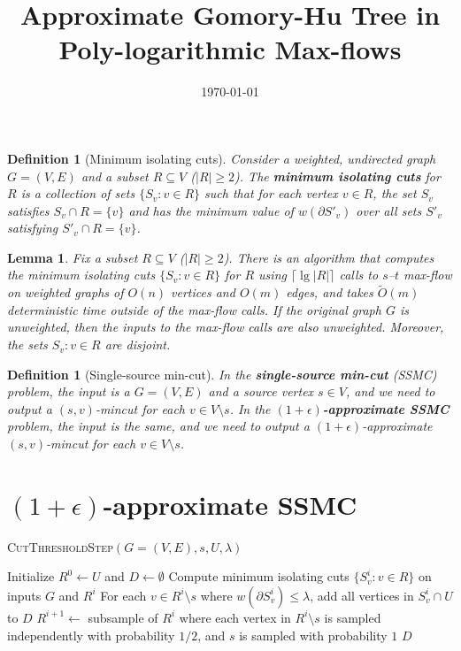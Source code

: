 \documentclass{article}
\newcommand{\sm}{\setminus}
\newcommand{\s}{\subseteq}
\newcommand{\e}{\epsilon}
\newcommand{\la}{\lambda}
\newcommand{\pt}{\partial}
\newcommand{\lf}{\lfloor}
\newcommand{\rf}{\rfloor}
\newcommand{\lc}{\lceil}
\newcommand{\rc}{\rceil}
\newcommand{\1}{\mathbbm 1}
\newtheorem{lemma}[theorem]{Lemma}
\newtheorem{definition}[theorem]{Definition}
\newcommand{\BL}{\begin{lemma}}
\newcommand{\EL}{\end{lemma}}
\newcommand{\BD}{\begin{definition}}
\newcommand{\ED}{\end{definition}}
\newcommand{\tO}{\tilde{O}}
\newcommand{\linel}[1]{\label{line:#1}}
\renewcommand{\emph}[1]{\textbf{\textup{#1}}}
\begin{document}
\title{Approximate Gomory-Hu Tree in Poly-logarithmic Max-flows}
\author{}
\date{\today}
\maketitle

\BD[Minimum isolating cuts]
Consider a weighted, undirected graph $G=(V,E)$ and a subset $R\s V$ ($|R|\ge2$). The \emph{minimum isolating cuts} for $R$ is a collection of sets $\{S_v:v\in R\}$ such that for each vertex $v\in R$, the set $S_v$ satisfies $S_v\cap R=\{v\}$ and has the minimum value of $w(\pt S'_v)$ over all sets $S'_v$ satisfying $S'_v\cap R=\{v\}$.
\ED

\BL
Fix a subset $R\s V$ ($|R|\ge2$). There is an algorithm that computes the minimum isolating cuts $\{S_v:v\in R\}$ for $R$ using $\lc\lg|R|\rc$ calls to $s$--$t$ max-flow on weighted graphs of $O(n)$ vertices and $O(m)$ edges, and takes $\tO(m)$ deterministic time outside of the max-flow calls. If the original graph $G$ is unweighted, then the inputs to the max-flow calls are also unweighted. Moreover, the sets $S_v:v\in R$ are disjoint.
\EL

\BD[Single-source min-cut]
In the \emph{single-source min-cut} (SSMC) problem, the input is a $G=(V,E)$ and a source vertex $s\in V$, and we need to output a $(s,v)$-mincut for each $v\in V\sm s$. In the \emph{$(1+\e)$-approximate SSMC} problem, the input is the same, and we need to output a $(1+\e)$-approximate $(s,v)$-mincut for each $v\in V\sm s$.
\ED

\section{$(1+\e)$-approximate SSMC}


\begin{algorithm}
\caption{\textsc{CutThresholdStep}$(G=(V,E),s,U,\la)$} \label{alg:main}
\begin{algorithmic}[1]
\State Initialize $R^0\gets U$ and $D\gets\emptyset$
\For{$i$ from $0$ to $\lf\lg|U|\rf$}
 \State Compute minimum isolating cuts $\{S^i_v:v\in R\}$ on inputs $G$ and $R^i$ \linel{Sv}
 \State For each $v\in R^i\sm s$ where $w(\pt S^i_v)\le\la$, add all vertices in $S^i_v\cap U$ to $D$
 \State $R^{i+1}\gets$ subsample of $R^i$ where each vertex in $R^i\sm s$ is sampled independently with probability $1/2$, and $s$ is sampled with probability $1$
\EndFor
\State\Return $D$
\end{algorithmic}
\end{algorithm}
\end{document}

